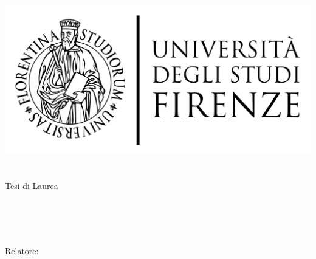 \begin{titlepage}
    \begin{addmargin}[-1.1cm]{-3.1cm}
    \begin{center}
        \large
        \hfill
        \vfill

        \begingroup
            \includegraphics[scale=0.15]{img/LOGO}\\
            \myFaculty \\
            \myDegree \\
            \vspace{0.5cm}
            \vspace{0.5cm}
            Tesi di Laurea        
        \endgroup
        
        \vfill
        \begingroup
            \color{Maroon}\spacedallcaps{\myTitle} \\ $\ $\\
            \spacedallcaps{\myEnglishTitle} \\
            \bigskip
        \endgroup

        \spacedlowsmallcaps{\myName}
        \vfill
        \vfill
        Relatore: \emph{\myProf}\\
        \vfill
        \vfill
        \myTime
        \vfill
    \end{center}
  \end{addmargin}
\end{titlepage}
